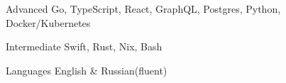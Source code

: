 
\begin{cvskills}

  \cvskill
    {Advanced}
    {Go, TypeScript, React, GraphQL, Postgres, Python, Docker/Kubernetes}

    \cvskill
    {Intermediate}
    {Swift, Rust, Nix, Bash}

  \cvskill
    {Languages}
    {English \& Russian(fluent)}

\end{cvskills}
